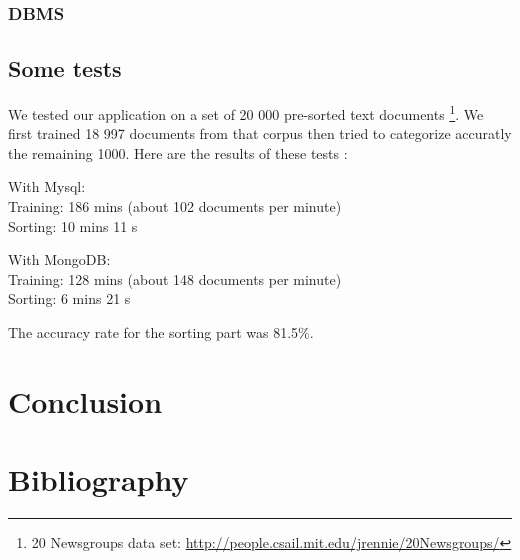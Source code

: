 \documentclass[a4paper,11pt]{article}
\begin{document}
\subsubsection{DBMS}


\subsection{Some tests}
    
We tested our application on a set of 20 000 pre-sorted text documents
\footnote{20 Newsgroups data set: \url{http://people.csail.mit.edu/jrennie/20Newsgroups/}}.
We first trained 18 997 documents from that corpus then tried to categorize
accuratly the remaining 1000. Here are the results of these tests :

With Mysql:\\
Training: 186 mins (about 102 documents per minute)\\
Sorting: 10 mins 11 s

With MongoDB:\\
Training: 128 mins (about 148 documents per minute)\\
Sorting: 6 mins 21 s

The accuracy rate for the sorting part was 81.5\%.

\section*{Conclusion}


\clearpage
\section*{Bibliography}
\end{document}
